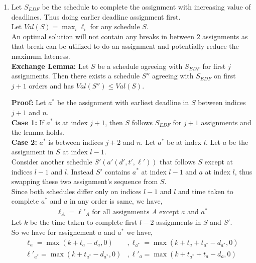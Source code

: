 \documentclass[11pt]{article}
\begin{document}
\begin{enumerate}
    \item Let $S_{EDF}$ be the schedule to complete the assignment with increasing value of deadlines. Thus doing earlier deadline assignment first.\\ Let $Val(S)=\max_i \ell_i$ for any schedule $S$.\\
    An optimal solution will not contain any breaks in between $2$ assignments as that break can be utilized to do an assignment and potentially reduce the maximum lateness.\\
    \textbf{Exchange Lemma: } Let $S$ be a schedule agreeing with $S_{EDF}$ for first $j$ assignments. Then there exists a schedule $S''$ agreeing with $S_{EDF}$ on first $j+1$ orders and has $Val(S'') \leq Val(S)$.
    
    \textbf{Proof:} Let $a^*$ be the assignment with earliest deadline in $S$ between indices $j+1$ and $n$.\\
    \textbf{Case 1:} If $a^*$ is at index $j+1$, then $S$ follows $S_{EDF}$ for $j+1$ assignments and the lemma holds.\\
    \textbf{Case 2:} $a^*$ is between indices $j+2$ and $n$. Let $a^*$ be at index $l$. Let $a$ be the assignment in $S$ at index $l-1$.\\
    Consider another schedule $S'(a'(d',t',\ell'))$ that follows $S$ except at indices $l-1$ and $l$. Instead $S'$ contains $a^*$ at index $l-1$ and $a$ at index $l$, thus swapping these two assignment's sequence from $S$.\\
    Since both schedules differ only on indices $l-1$ and $l$ and time taken to complete $a^*$ and $a$ in any order is same, we have,
        \begin{equation} \label{eq3_1}
        \begin{split}
            \ell_A=\ell'_{A}\text{ for all assignments $A$ except } a \text{ and } a^*
        \end{split}
    \end{equation}
    Let $k$ be the time taken to complete first $l-2$ assignments in $S$ and $S'$.\\
    So we have for assignement $a$ and $a^*$ we have,
    \begin{equation}
        \begin{split} \label{eq3_2}
            \ell_a = \max(k+t_a-d_a, 0) &, \ell_{a^*} = \max(k+t_a+t_{a^*}-d_{a^*}, 0)\\
            \ell'_{a^*} = \max(k+t_{a^*}-d_{a^*}, 0) &, \ell'_{a} = \max(k+t_{a^*}+t_a-d_a, 0)

\end{split}
\end{equation}
\end{enumerate}
\end{document}
